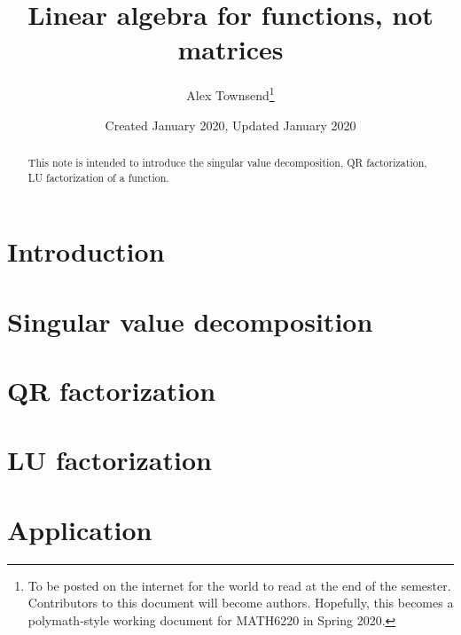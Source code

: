 \documentclass{article}
\title{Linear algebra for functions, not matrices}
\author{Alex Townsend\footnote{To be posted on the internet for the world to read at the end of the semester. Contributors to this document will become authors. Hopefully, this becomes a polymath-style working document for MATH6220 in Spring 2020.}}
\date{Created January 2020, Updated January 2020}
\begin{document}
\maketitle
\begin{abstract} 
This note is intended to introduce the singular value decomposition, QR factorization, LU factorization of a function. 
\end{abstract}

\tableofcontents

\section{Introduction} %

\section{Singular value decomposition} %

\section{QR factorization} 

\section{LU factorization}

\section{Application} 
\end{document}
